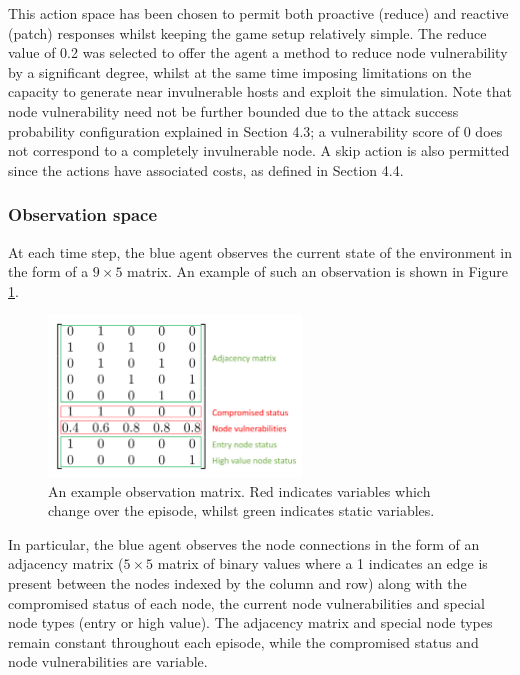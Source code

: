 \documentclass{article}
\begin{document}
This action space has been chosen to permit both proactive (reduce) and reactive (patch) responses whilst keeping the game setup relatively simple. The reduce value of 0.2 was selected to offer the agent a method to reduce node vulnerability by a significant degree, whilst at the same time imposing limitations on the capacity to generate near invulnerable hosts and exploit the simulation. Note that node vulnerability need not be further bounded due to the attack success probability configuration explained in Section 4.3; a vulnerability score of 0 does not correspond to a completely invulnerable node. A skip action is also permitted since the actions have associated costs, as defined in Section 4.4.

\subsubsection{Observation space}
At each time step, the blue agent observes the current state of the environment in the form of a $9 \times 5$ matrix. An example of such an observation is shown in Figure \ref{fig:example_obs}.

\begin{figure}[htp]
    \centering
    \includegraphics[width=0.6\textwidth]{Images/Example_obs.png}
    \caption{An example observation matrix. Red indicates variables which change over the episode, whilst green indicates static variables. }
    \label{fig:example_obs}
\end{figure}

In particular, the blue agent observes the node connections in the form of an adjacency matrix ($5 \times 5$ matrix of binary values where a 1 indicates an edge is present between the nodes indexed by the column and row) along with the compromised status of each node, the current node vulnerabilities and special node types (entry or high value). The adjacency matrix and special node types remain constant throughout each episode, while the compromised status and node vulnerabilities are variable. 
\end{document}
